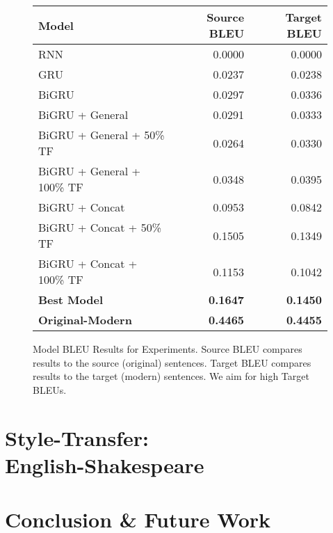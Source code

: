\documentclass[twoside,twocolumn]{article}
\begin{document}
\begin{figure*}
    \centering
    \begin{tabular}{ |l|r|r| }
        \hline
        \textbf{Model}
          & \textbf{Source BLEU} & \textbf{Target BLEU} \\
        \hline
        RNN                             & 0.0000 & 0.0000 \\ \hline
        GRU                             & 0.0237 & 0.0238 \\ \hline
        BiGRU                           & 0.0297 & 0.0336 \\ \hline
        BiGRU + General                 & 0.0291 & 0.0333 \\ \hline
        BiGRU + General + 50\% TF       & 0.0264 & 0.0330 \\ \hline
        BiGRU + General + 100\% TF      & 0.0348 & 0.0395 \\ \hline
        BiGRU + Concat                  & 0.0953 & 0.0842 \\ \hline
        BiGRU + Concat + 50\% TF        & 0.1505 & 0.1349 \\ \hline
        BiGRU + Concat + 100\% TF       & 0.1153 & 0.1042 \\ \hline
        \textbf{Best Model}             & \textbf{0.1647} & \textbf{0.1450} \\ \hline
        \textbf{Original-Modern}  & \textbf{0.4465} & \textbf{0.4455} \\ \hline
    \end{tabular}

    \caption{Model BLEU Results for Experiments. Source BLEU compares results
    to the source (original) sentences. Target BLEU compares results to
    the target (modern) sentences. We aim for high Target BLEUs.}
    \label{fig:model-bleu}
\end{figure*}
\section{Style-Transfer:\\English-Shakespeare}
\label{sec:style-transfer}
\section{Conclusion \& Future Work}
\label{sec:conclusion}


\end{document}

